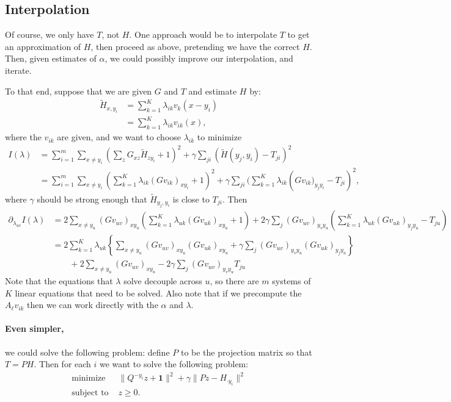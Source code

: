 \documentclass{article}
\newcommand{\bone}{\mathbf{1}}
\begin{document}
\subsection*{Interpolation}

Of course, we only have $T$, not $H$.
One approach would be to interpolate $T$ to get an approximation of $H$,
then proceed as above, pretending we have the correct $H$.
Then, given estimates of $\alpha$, we could possibly improve our interpolation,
and iterate.

To that end, suppose that we are given $G$ and $T$ and estimate $H$ by:
\begin{align}
  \tilde H_{x,y_i} &= \sum_{k=1}^K \lambda_{ik} v_{k}(x-y_i) \\
  &= \sum_{k=1}^K \lambda_{ik} v_{ik}(x) ,
\end{align}
where the $v_{ik}$ are given, and we want to choose $\lambda_{ik}$ to minimize
\begin{align}
  I(\lambda) &= \sum_{i=1}^m \sum_{x \neq y_i} \left( \sum_z G_{xz} \tilde H_{z y_i} + 1 \right)^2  + \gamma \sum_{ji} ( \tilde H(y_j,y_i) - T_{ji} )^2\\
  &=\sum_{i=1}^m \sum_{x \neq y_i} \left( \sum_{k=1}^K \lambda_{ik} (Gv_{ik})_{x y_i}  + 1 \right)^2  
  + \gamma \sum_{ji} ( \sum_{k=1}^K \lambda_{ik} \left(Gv_{ik})_{y_j y_i} - T_{ji} \right)^2,
\end{align}
where $\gamma$ should be strong enough that $\tilde H_{y_j,y_i}$ is close to $T_{ji}$.
Then
\begin{align}
  \partial_{\lambda_{uv}} I(\lambda)  &=
  2 \sum_{x \neq y_u} ( G v_{uv} )_{x y_u} \left( \sum_{k=1}^K \lambda_{uk} (Gv_{uk})_{x y_u}  + 1 \right)  
  + 2 \gamma \sum_{j} (G v_{uv})_{y_v y_u} \left( \sum_{k=1}^K \lambda_{uk} (Gv_{uk})_{y_j y_u} - T_{ju} \right)  \\
  &= 2 \sum_{k=1}^K \lambda_{uk} \left\{ 
  \sum_{x \neq y_u} ( G v_{uv} )_{x y_u} (Gv_{uk})_{x y_u}   
  + \gamma \sum_{j} (G v_{uv})_{y_v y_u} (Gv_{uk})_{y_j y_u}  \right\} \\
  & \qquad {}
  + 2 \sum_{x \neq y_u} ( G v_{uv} )_{x y_u} - 2 \gamma \sum_{j} (G v_{uv})_{y_v y_u} T_{ju} 
\end{align}
Note that the equations that $\lambda$ solve decouple across $u$, 
so there are $m$ systems of $K$ linear equations that need to be solved.
Also note that if we precompute the $A_\ell v_{ik}$ then we can work directly with the $\alpha$ and $\lambda$.


\paragraph{Even simpler,}
we could solve the following problem:
define $P$ to be the projection matrix so that $T = PH$.
Then for each $i$ we want to solve the following problem:
\begin{align}
    \text{minimize } & \| Q^{-y_i} z + \bone \|^2 + \gamma \| Pz - H_{\cdot y_i} \|^2 \\
    \text{subject to } &  z \ge 0 .
\end{align}
\end{document}

